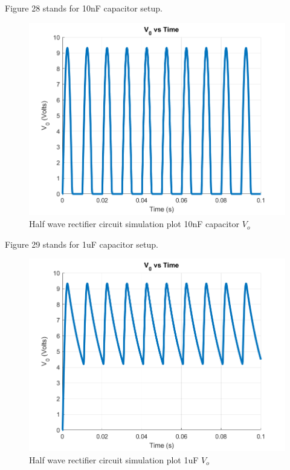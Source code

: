\documentclass[letterpaper,12pt]{article}
\begin{document}
Figure 28 stands for 10nF capacitor setup.
\begin{figure}[H]
    \centering
   \includegraphics[width=1\textwidth]{6_10nF.png}
   \caption{Half wave rectifier circuit simulation plot 10nF capacitor \(V_o\) }
\end{figure} 
Figure 29 stands for 1uF capacitor setup.
\begin{figure}[H]
    \centering
   \includegraphics[width=1\textwidth]{6_1uF.png}
   \caption{Half wave rectifier circuit simulation plot 1uF \(V_o\) }
\end{figure} 
\end{document}
